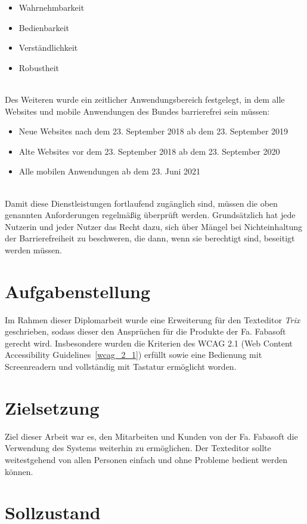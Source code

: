 \begin{itemize}
    \item Wahrnehmbarkeit
    \item Bedienbarkeit
    \item Verständlichkeit
    \item Robustheit
\end{itemize}

\mbox{}\\Des Weiteren wurde ein zeitlicher Anwendungsbereich festgelegt, in dem alle Websites und mobile Anwendungen des Bundes barrierefrei sein müssen:

\begin{itemize}
    \item Neue Websites nach dem 23. September 2018 ab dem 23. September 2019
    \item Alte Websites vor dem 23. September 2018 ab dem 23. September 2020
    \item Alle mobilen Anwendungen ab dem 23. Juni 2021
\end{itemize}

\mbox{}\\Damit diese Dienstleistungen fortlaufend zugänglich sind, müssen die oben genannten Anforderungen regelmäßig überprüft werden. Grundsätzlich hat jede Nutzerin und jeder Nutzer das Recht dazu, sich über Mängel bei Nichteinhaltung der Barrierefreiheit zu beschweren, die dann, wenn sie berechtigt sind, beseitigt werden müssen. 

\section{Aufgabenstellung}
Im Rahmen dieser Diplomarbeit wurde eine Erweiterung für den Texteditor {\em{Trix}} geschrieben, sodass dieser den Ansprüchen für die Produkte der Fa. Fabasoft gerecht wird.  Insbesondere wurden die Kriterien des WCAG 2.1 (Web Content Accessibility Guidelines~\ref{wcag_2_1}) erfüllt sowie eine Bedienung mit Screenreadern und vollständig mit Tastatur ermöglicht worden.

\section{Zielsetzung}
Ziel dieser Arbeit war es, den Mitarbeiten und Kunden von der Fa. Fabasoft die Verwendung des Systems weiterhin zu ermöglichen. Der Texteditor sollte weitestgehend von allen Personen einfach und ohne Probleme bedient werden können.

\section{Sollzustand}

